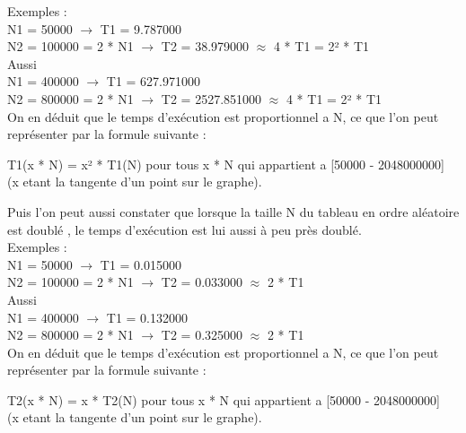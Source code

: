 \documentclass[12pt]{article}
\begin{document}
Exemples :\\
N1 = 50000 $\rightarrow$ T1 = 9.787000 \\
N2 = 100000 = 2 * N1 $\rightarrow$ T2 = 38.979000 $\approx$ 4 * T1 = 2² * T1\\

Aussi\\
N1 = 400000 $\rightarrow$ T1 = 627.971000\\
N2 = 800000 = 2 * N1 $\rightarrow$ T2 = 2527.851000 $\approx$ 4 * T1 = 2² * T1\\

On en déduit que le temps d'exécution est proportionnel a N, ce que l'on peut représenter par la formule suivante :\\

\begin{center}

\color{red}
T1(x * N) = x² * T1(N) pour tous x * N qui appartient a [50000 - 2048000000]\\
\color{black}
(x etant la tangente d'un point sur le graphe).\\

\end{center}

 Puis l'on peut aussi constater que lorsque la taille N du \color{blue} tableau en ordre aléatoire \color{black} est doublé ,
 le temps d'exécution est lui aussi à peu près doublé.\\
 
 Exemples :\\
N1 = 50000 $\rightarrow$ T1 = 0.015000\\
N2 = 100000 = 2 * N1 $\rightarrow$ T2 = 0.033000 $\approx$ 2 * T1 \\

Aussi\\
N1 = 400000 $\rightarrow$ T1 = 0.132000 \\
N2 = 800000 = 2 * N1 $\rightarrow$ T2 =  0.325000 $\approx$ 2 * T1 \\

On en déduit que le temps d'exécution est proportionnel a N, ce que l'on peut représenter par la formule suivante :\\

\begin{center}

\color{red}
T2(x * N) = x * T2(N) pour tous x * N qui appartient a [50000 - 2048000000]\\
\color{black}
(x etant la tangente d'un point sur le graphe).\\

\end{center}
\end{document}
